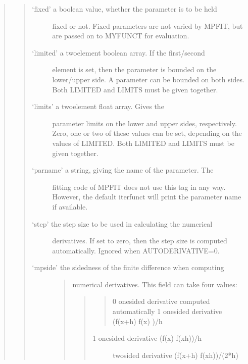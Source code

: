 \documentclass[letterpaper,10pt,english]{sphinxmanual}
\begin{document}
\begin{quote}
\begin{quote}
\begin{description}
\item[{‘fixed’ \sphinxhyphen{} a boolean value, whether the parameter is to be held}] \leavevmode
fixed or not.  Fixed parameters are not varied by
MPFIT, but are passed on to MYFUNCT for evaluation.

\item[{‘limited’ \sphinxhyphen{} a two\sphinxhyphen{}element boolean array.  If the first/second}] \leavevmode
element is set, then the parameter is bounded on the
lower/upper side.  A parameter can be bounded on both
sides.  Both LIMITED and LIMITS must be given
together.

\item[{‘limits’ \sphinxhyphen{} a two\sphinxhyphen{}element float array.  Gives the}] \leavevmode
parameter limits on the lower and upper sides,
respectively.  Zero, one or two of these values can be
set, depending on the values of LIMITED.  Both LIMITED
and LIMITS must be given together.

\item[{‘parname’ \sphinxhyphen{} a string, giving the name of the parameter.  The}] \leavevmode
fitting code of MPFIT does not use this tag in any
way.  However, the default iterfunct will print the
parameter name if available.

\item[{‘step’ \sphinxhyphen{} the step size to be used in calculating the numerical}] \leavevmode
derivatives.  If set to zero, then the step size is
computed automatically.  Ignored when AUTODERIVATIVE=0.

\item[{‘mpside’ \sphinxhyphen{} the sidedness of the finite difference when computing}] \leavevmode\begin{quote}

numerical derivatives.  This field can take four
values:
\begin{quote}
\begin{quote}

0 \sphinxhyphen{} one\sphinxhyphen{}sided derivative computed automatically
1 \sphinxhyphen{} one\sphinxhyphen{}sided derivative (f(x+h) \sphinxhyphen{} f(x)  )/h
\end{quote}
\begin{description}
\item[{\sphinxhyphen{}1 \sphinxhyphen{} one\sphinxhyphen{}sided derivative (f(x)   \sphinxhyphen{} f(x\sphinxhyphen{}h))/h}]  \sphinxhyphen{} two\sphinxhyphen{}sided derivative (f(x+h) \sphinxhyphen{} f(x\sphinxhyphen{}h))/(2*h)


\end{description}
\end{quote}
\end{quote}
\end{description}
\end{quote}
\end{quote}
\end{document}
